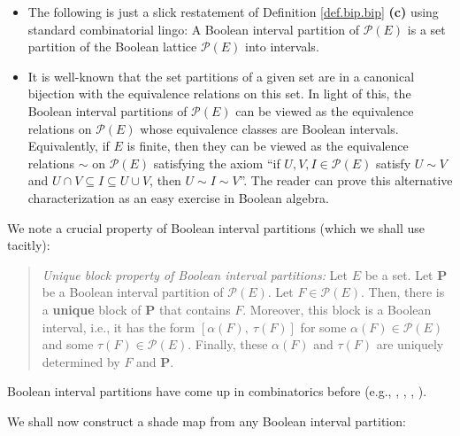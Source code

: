 \documentclass[numbers=enddot,12pt,final,onecolumn]{scrartcl}%
\newcounter{exer}
\theoremstyle{definition}
\newenvironment{statement}{\begin{quote}}{\end{quote}}
\newenvironment{verlong}{}{}
\begin{document}
\begin{itemize}
\item The following is just a slick restatement of Definition
\ref{def.bip.bip} \textbf{(c)} using standard combinatorial lingo: A Boolean
interval partition of $\mathcal{P}\left(  E\right)  $ is a set partition of
the Boolean lattice $\mathcal{P}\left(  E\right)  $ into intervals.

\item It is well-known that the set partitions of a given set are in a
canonical bijection with the equivalence relations on this set. In light of
this, the Boolean interval partitions of $\mathcal{P}\left(  E\right)  $ can
be viewed as the equivalence relations on $\mathcal{P}\left(  E\right)  $
whose equivalence classes are Boolean intervals. Equivalently, if $E$ is
finite, then they can be
viewed as the equivalence relations $\sim$ on $\mathcal{P}\left(  E\right)  $
satisfying the axiom \textquotedblleft if $U,V,I\in\mathcal{P}\left(
E\right)  $ satisfy $U\sim V$ and $U\cap V\subseteq I\subseteq U\cup V$, then
$U\sim I\sim V$\textquotedblright. The reader can prove this alternative
characterization as an easy exercise in Boolean algebra.
\end{itemize}

\begin{verlong}
We note a crucial property of Boolean interval partitions (which we shall use tacitly):

\begin{statement}
\textit{Unique block property of Boolean interval partitions:} Let $E$ be a
set. Let $\mathbf{P}$ be a Boolean interval partition of $\mathcal{P}\left(
E\right)  $. Let $F\in\mathcal{P}\left(  E\right)  $. Then, there is a
\textbf{unique} block of $\mathbf{P}$ that contains $F$. Moreover, this block
is a Boolean interval, i.e., it has the form $\left[  \alpha\left(  F\right)
,\ \tau\left(  F\right)  \right]  $ for some $\alpha\left(  F\right)
\in\mathcal{P}\left(  E\right)  $ and some $\tau\left(  F\right)
\in\mathcal{P}\left(  E\right)  $. Finally, these $\alpha\left(  F\right)  $
and $\tau\left(  F\right)  $ are uniquely determined by $F$ and $\mathbf{P}$.
\end{statement}
\end{verlong}

Boolean interval partitions have come up in combinatorics before (e.g.,
\cite{BrOlNo09}, \cite{Dawson80}, \cite{DedTit20}, \cite{GorMah97}).

We shall now construct a shade map from any Boolean interval partition:
\end{document}
